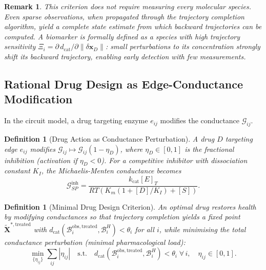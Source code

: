 \documentclass[twocolumn,10pt,a4paper]{article}
\newcommand{\dcat}{d_{\mathrm{cat}}}
\newcommand{\Gcond}{\mathcal{G}}
\newcommand{\Back}{\mathcal{B}}
\newtheorem{definition}[theorem]{Definition}
\newtheorem{remark}[theorem]{Remark}
\begin{document}
\begin{remark}
This criterion does not require measuring every molecular species.  Even sparse
observations, when propagated through the trajectory completion algorithm,
yield a complete state estimate from which backward trajectories can be
computed.  A biomarker is formally defined as a species with high
\emph{trajectory sensitivity} $\Xi_i=\partial\,\dcat/\partial\|\delta\mathbf{x}_D\|$:
small perturbations to its concentration strongly shift its backward trajectory,
enabling early detection with few measurements.
\end{remark}

\subsection{Rational Drug Design as Edge-Conductance Modification}
\label{sec:app-drugs}

In the circuit model, a drug targeting enzyme $e_{ij}$ modifies the
conductance $\Gcond_{ij}$.

\begin{definition}[Drug Action as Conductance Perturbation]
\label{def:drug}
A drug $D$ targeting edge $e_{ij}$ modifies
$\Gcond_{ij}\mapsto\Gcond_{ij}(1-\eta_D)$, where $\eta_D\in[0,1]$ is the
fractional inhibition (activation if $\eta_D<0$).  For a competitive inhibitor
with dissociation constant $K_I$, the Michaelis-Menten conductance becomes
\begin{equation}
  \Gcond_{SP}^{\mathrm{inh}} = \frac{k_{\mathrm{cat}}[E]_T}
    {RT(K_m(1+[D]/K_I)+[S])}.
  \label{eq:mm-inhib}
\end{equation}
\end{definition}

\begin{definition}[Minimal Drug Design Criterion]
\label{def:drug-design}
An optimal drug restores health by modifying conductances so that trajectory
completion yields a fixed point $\widetilde{\mathbf{X}}^{*,\mathrm{treated}}$
with $\dcat(\Back_i^{\mathrm{obs,treated}},\Back_i^H)<\theta_i$ for all $i$,
while minimising the total conductance perturbation (minimal pharmacological
load):
\begin{equation}
  \min_{\{\eta_{ij}\}}\sum_{ij}|\eta_{ij}|
  \quad\text{s.t.}\quad
  \dcat(\Back_i^{\mathrm{obs,treated}},\Back_i^H)<\theta_i\;\forall\,i,
  \quad\eta_{ij}\in[0,1].
  \label{eq:drug-opt}
\end{equation}
\end{definition}
\end{document}
